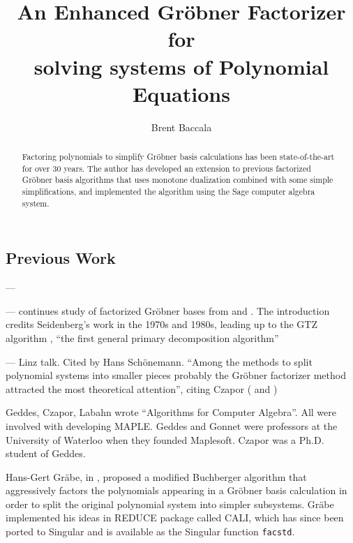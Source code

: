 \documentclass{article}
\title{An Enhanced Gr\"obner Factorizer for\\ solving systems of Polynomial Equations}
\author{Brent Baccala}
\begin{document}
\parindent 0pt

\maketitle

\begin{abstract}
Factoring polynomials to simplify Gr\"obner basis calculations has
been state-of-the-art for over 30 years.
The author has developed an extension to previous factorized Gr\"obner basis algorithms
that uses monotone dualization combined with some simple simplifications, and
implemented the algorithm using the Sage computer algebra system.
\end{abstract}


\parskip 12pt

\subsection*{Previous Work}

\cite{Grabe94} ---

\cite{Grabe96} --- continues study of factorized Gr\"obner bases from \cite{Grabe94} and \cite{Grabe95}.
The introduction credits Seidenberg's work in the 1970s and 1980s, leading up to the GTZ
algorithm \cite{GTZ}, ``the first general primary decomposition algorithm''

\cite{Grabe06} --- Linz talk.  Cited by Hans Sch\"onemann. ``Among the methods to split polynomial systems into smaller pieces probably the Gr\"obner
factorizer method attracted the most theoretical attention'', citing Czapor (\cite{Czapor87} and \cite{Czapor89})

Geddes, Czapor, Labahn wrote ``Algorithms for Computer Algebra''.  All were involved with developing MAPLE.
Geddes and Gonnet were professors at the University of Waterloo when they founded Maplesoft.
Czapor was a Ph.D. student of Geddes.


Hans-Gert Gr\"abe, in \cite{Grabe94}, proposed a modified Buchberger algorithm
that aggressively factors the polynomials appearing in a Gr\"obner basis
calculation in order to split the original polynomial system into simpler subsystems.
Gr\"abe implemented his ideas in REDUCE package called CALI, which has since been ported
to Singular and is available as the Singular function {\tt facstd}.
\end{document}

